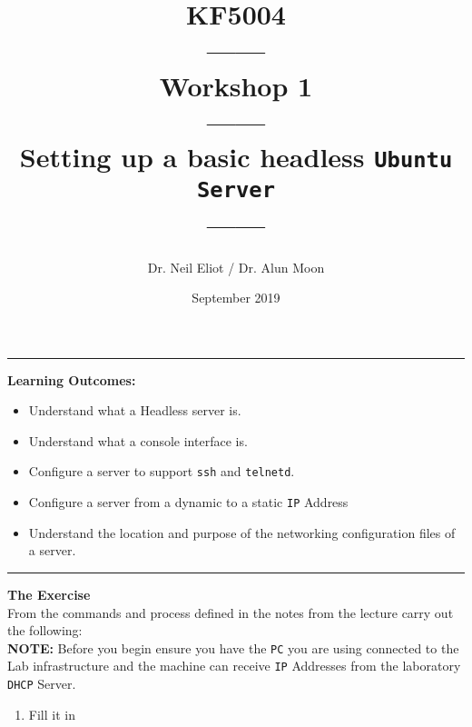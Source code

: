 \documentclass[11pt]{article}
\begin{document}
\author{Dr. Neil Eliot / Dr. Alun Moon}
\title{KF5004\\------\\Workshop 1\\------\\Setting up a basic headless \texttt{Ubuntu Server}\\------}
\date{September 2019}
\maketitle

\medskip

\begin{center}
    \noindent\rule{8cm}{0.4pt}
\end{center}


\noindent\textbf{Learning Outcomes:}
\begin{itemize}
    \item Understand what a Headless server is.
    \item Understand what a console interface is.
    \item Configure a server to support \texttt{ssh} and \texttt{telnetd}.
    \item Configure a server from a dynamic to a static \texttt{IP} Address
    \item Understand the location and purpose of the networking configuration files of a server.
\end{itemize}

\begin{center}
\noindent\rule{8cm}{0.4pt}
\end{center}

\noindent\textbf{The Exercise}\\

\noindent From the commands and process defined in the notes from the lecture carry out the following:\\

\noindent\textbf{NOTE:} Before you begin ensure you have the \texttt{PC} you are using connected to the Lab infrastructure and the machine can receive \texttt{IP} Addresses from the laboratory \texttt{DHCP} Server.

\begin{enumerate}

\item Fill it in

\end{enumerate}
\end{document}

